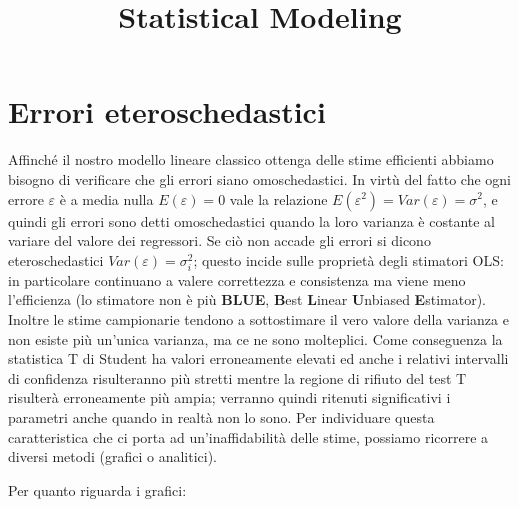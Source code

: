 \documentclass[a4page, 11pt]{article} %
\title{Statistical Modeling}
\author{}
\date{}
\begin{document}
\maketitle
\section{Errori eteroschedastici}
Affinché il nostro modello lineare classico ottenga delle stime efficienti abbiamo bisogno di verificare che gli errori siano omoschedastici. 
In virtù del fatto che ogni errore $\varepsilon$ è a media nulla $E(\varepsilon) = 0$ vale la relazione $E(\varepsilon^2) = Var(\varepsilon) = \sigma^2$, e quindi gli errori sono detti omoschedastici quando la loro varianza è costante al variare del valore dei regressori.
Se ciò non accade gli errori si dicono eteroschedastici $Var(\varepsilon) = \sigma_i^2$; questo incide sulle proprietà degli stimatori OLS: in particolare continuano a valere correttezza e consistenza ma viene meno l’efficienza (lo stimatore non è più \textbf{BLUE}, \textbf{B}est \textbf{L}inear \textbf{U}nbiased \textbf{E}stimator). 
Inoltre le stime campionarie tendono a sottostimare il vero valore della varianza e non esiste più un’unica varianza, ma ce ne sono molteplici. 
Come conseguenza la statistica T di Student ha valori erroneamente elevati ed anche i relativi intervalli di confidenza risulteranno più stretti mentre la regione di rifiuto del test T risulterà erroneamente più ampia; verranno quindi ritenuti significativi i parametri anche quando in realtà non lo sono. 
Per individuare questa caratteristica che ci porta ad un’inaffidabilità delle stime, possiamo ricorrere a diversi metodi (grafici o analitici).

Per quanto riguarda i grafici:
\end{document}
